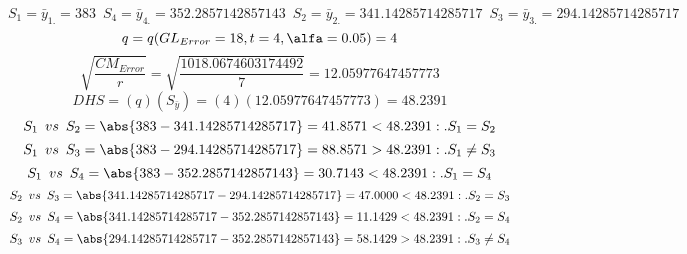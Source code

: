 $$S_{1}=\bar{y}_{1.}=383 \enspace S_{4}=\bar{y}_{4.}=352.2857142857143 \enspace S_{2}=\bar{y}_{2.}=341.14285714285717 \enspace S_{3}=\bar{y}_{3.}=294.14285714285717$$
$$q=q(GL_{Error}=18, t=4, \alfa=0.05)=4$$
$$\sqrt{\frac{CM_{Error}}{r}}=\sqrt{\frac{1018.0674603174492}{7}}=12.05977647457773$$
$$DHS=(q)(S_{\bar{y}})=(4)(12.05977647457773)=48.2391$$
$$S_{1} \enspace vs \enspace S_{2} = \abs{383-341.14285714285717}=41.8571<48.2391:.S_{1}=S_{2}$$
$$S_{1} \enspace vs \enspace S_{3} = \abs{383-294.14285714285717}=88.8571>48.2391:.S_{1}\not=S_{3}$$
$$S_{1} \enspace vs \enspace S_{4} = \abs{383-352.2857142857143}=30.7143<48.2391:.S_{1}=S_{4}$$
$$S_{2} \enspace vs \enspace S_{3} = \abs{341.14285714285717-294.14285714285717}=47.0000<48.2391:.S_{2}=S_{3}$$
$$S_{2} \enspace vs \enspace S_{4} = \abs{341.14285714285717-352.2857142857143}=11.1429<48.2391:.S_{2}=S_{4}$$
$$S_{3} \enspace vs \enspace S_{4} = \abs{294.14285714285717-352.2857142857143}=58.1429>48.2391:.S_{3}\not=S_{4}$$


